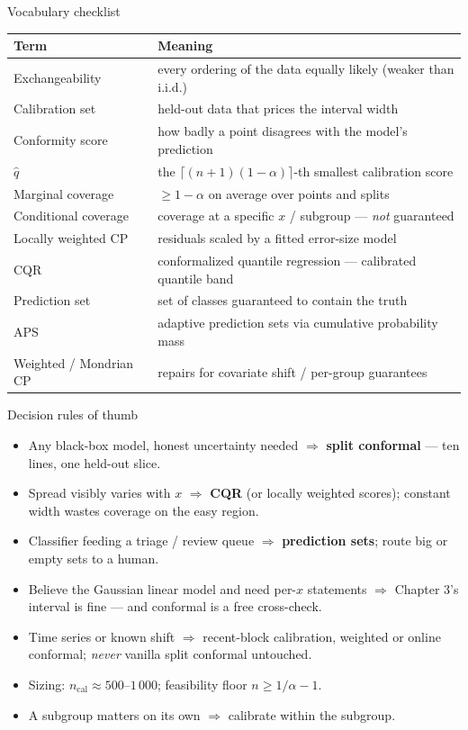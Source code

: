 \documentclass[aspectratio=169,11pt]{beamer}
\begin{document}
\begin{frame}{Vocabulary checklist}
  \footnotesize
  \begin{tabular}{ll}
    \toprule
    \textbf{Term} & \textbf{Meaning} \\
    \midrule
    Exchangeability & every ordering of the data equally likely (weaker than i.i.d.) \\
    Calibration set & held-out data that prices the interval width \\
    Conformity score & how badly a point disagrees with the model's prediction \\
    $\hat q$ & the $\lceil (n+1)(1-\alpha) \rceil$-th smallest calibration score \\
    Marginal coverage & $\ge 1 - \alpha$ on average over points and splits \\
    Conditional coverage & coverage at a specific $x$ / subgroup --- \emph{not} guaranteed \\
    Locally weighted CP & residuals scaled by a fitted error-size model \\
    CQR & conformalized quantile regression --- calibrated quantile band \\
    Prediction set & set of classes guaranteed to contain the truth \\
    APS & adaptive prediction sets via cumulative probability mass \\
    Weighted / Mondrian CP & repairs for covariate shift / per-group guarantees \\
    \bottomrule
  \end{tabular}
\end{frame}

\begin{frame}{Decision rules of thumb}
  \begin{itemize}
    \item Any black-box model, honest uncertainty needed $\Rightarrow$ \textbf{split
          conformal} --- ten lines, one held-out slice.
    \item Spread visibly varies with $x$ $\Rightarrow$ \textbf{CQR} (or locally
          weighted scores); constant width wastes coverage on the easy region.
    \item Classifier feeding a triage / review queue $\Rightarrow$ \textbf{prediction
          sets}; route big or empty sets to a human.
    \item Believe the Gaussian linear model and need per-$x$ statements
          $\Rightarrow$ Chapter 3's interval is fine --- and conformal is a free
          cross-check.
    \item Time series or known shift $\Rightarrow$ recent-block calibration, weighted
          or online conformal; \emph{never} vanilla split conformal untouched.
    \item Sizing: $n_{\text{cal}} \approx 500$--$1\,000$; feasibility floor
          $n \ge 1/\alpha - 1$.
    \item A subgroup matters on its own $\Rightarrow$ calibrate within the subgroup.
  \end{itemize}
\end{frame}
\end{document}

